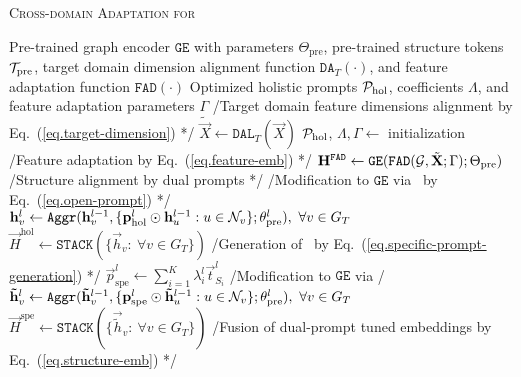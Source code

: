 \begin{algorithm}[b]
\small
\caption{\textsc{Cross-domain Adaptation for \model}}
\label{alg.prompt}
\begin{algorithmic}[1]
    \Require Pre-trained graph encoder $\mathtt{GE}$ with parameters $\Theta_\text{pre}$, pre-trained structure tokens $\mathcal{T}_\text{pre}$, target domain dimension alignment function $\mathtt{DA}_T(\cdot)$, and feature adaptation function $\mathtt{FAD}(\cdot)$
    \Ensure Optimized holistic prompts $\mathcal{P}_\text{hol}$, coefficients $\Lambda$, and feature adaptation parameters $\Gamma$
            \State \slash* Target domain feature dimensions alignment by Eq.~(\ref{eq.target-dimension}) *\slash
            \State $\tilde{\Vec{X}}\leftarrow \mathtt{DAL}_T(\Vec{X})$
            \State $\mathcal{P}_\text{hol}$, $\Lambda, \Gamma \leftarrow$ initialization
                \State \slash* Feature adaptation by Eq.~(\ref{eq.feature-emb}) *\slash
                \State $\Vec{H}^\mathtt{FAD} \leftarrow \mathtt{GE}(\mathtt{FAD}(\bG,\tilde{\Vec{X}};\Gamma);\Theta_\text{pre})$
                \State \slash* Structure alignment by dual prompts *\slash
                \State \slash* Modification to $\mathtt{GE}$ via \op\ by Eq.~(\ref{eq.open-prompt}) *\slash
                    \State $\vec{h}^l_{v} \leftarrow \mathtt{Aggr}(\vec{h}^{l-1}_{v}, \{\Vec{p}^l_\text{hol} \odot \vec{h}^{l-1}_{u} : u\in\bN_v\}; \theta^l_\text{pre}),~\forall v\in G_T$
                \EndFor
                \State $\vec{H}^\text{hol}\leftarrow \mathtt{STACK}(\{\vec{h}_{v}:~\forall v\in G_T\})$
                \State \slash* Generation of \cp\ by Eq.~(\ref{eq.specific-prompt-generation}) *\slash
                    \State $\Vec{p}^l_\text{spe} \leftarrow \sum_{i=1}^K \lambda^l_i \Vec{t}^l_{S_i}$
                \EndFor
                \State \slash* Modification to $\mathtt{GE}$ via \cp *\slash
                    \State $\vec{\tilde{h}}^l_{v} \leftarrow \mathtt{Aggr}(\vec{\tilde{h}}^{l-1}_{v}, \{\Vec{p}^l_\text{spe} \odot \vec{\tilde{h}}^{l-1}_{u} : u\in\bN_v\}; \theta^l_\text{pre}),~\forall v\in G_T$
                \EndFor
                \State $\vec{H}^\text{spe}\leftarrow \mathtt{STACK}(\{\vec{\tilde{h}}_{v}:~\forall v\in G_T\})$
                \State \slash* Fusion of dual-prompt tuned embeddings by Eq.~(\ref{eq.structure-emb}) *\slash

\end{algorithmic}
\end{algorithm}
